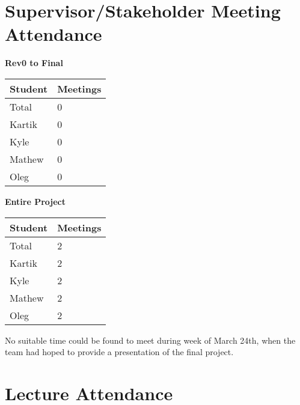 \documentclass{article}
\begin{document}
\section{Supervisor/Stakeholder Meeting Attendance}



\begin{table}[H]
    \centering
    \textbf{Rev0 to Final}\\
    \begin{tabular}{ll}
    \toprule
    \textbf{Student} & \textbf{Meetings}\\
    \midrule
    Total  & 0\\
    Kartik & 0\\
    Kyle   & 0\\
    Mathew & 0\\
    Oleg   & 0\\
\bottomrule
\end{tabular}
\end{table}


\begin{table}[H]
\centering
\textbf{Entire Project}\\
\begin{tabular}{ll}
\toprule
\textbf{Student} & \textbf{Meetings}\\
\midrule
Total  & 2\\
Kartik & 2\\
Kyle   & 2\\
Mathew & 2\\
Oleg   & 2\\
\bottomrule
\end{tabular}
\end{table}

No suitable time could be found to meet during week of March 24th, when the team had hoped to provide a presentation of the final project.
\section{Lecture Attendance}
\end{document}
